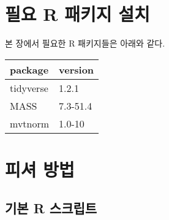 \documentclass[]{book}
\begin{document}
\hypertarget{da-packages-install}{%
\section{필요 R 패키지 설치}\label{da-packages-install}}

본 장에서 필요한 R 패키지들은 아래와 같다.

\begin{tabular}{l|l}
\hline
package & version\\
\hline
tidyverse & 1.2.1\\
\hline
MASS & 7.3-51.4\\
\hline
mvtnorm & 1.0-10\\
\hline
\end{tabular}

\hypertarget{da-fisher}{%
\section{피셔 방법}\label{da-fisher}}

\hypertarget{da-fisher-basic-script}{%
\subsection{기본 R 스크립트}\label{da-fisher-basic-script}}
\end{document}
